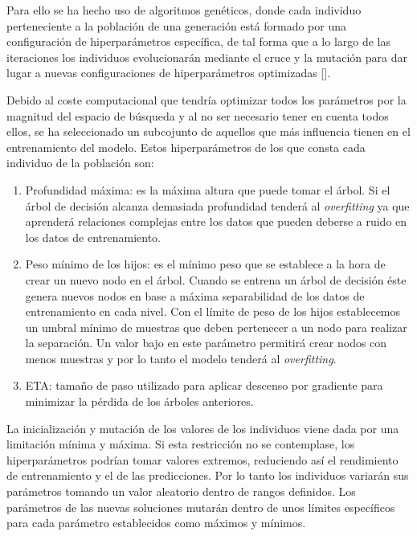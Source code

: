         Para ello se ha hecho uso de algoritmos genéticos, donde cada individuo perteneciente a la población de una generación está formado por una configuración de hiperparámetros específica, de tal forma que a lo largo de las iteraciones los individuos evolucionarán mediante el cruce y la mutación para dar lugar a nuevas configuraciones de hiperparámetros optimizadas [\cite{GAXGBoostPaper}].

        Debido al coste computacional que tendría optimizar todos los parámetros por la magnitud del espacio de búsqueda y al no ser necesario tener en cuenta todos ellos, se ha seleccionado un subcojunto de aquellos que más influencia tienen en el entrenamiento del modelo. Estos hiperparámetros de los que consta cada individuo de la población son:

        \begin{enumerate}

            \item Profundidad máxima: es la máxima altura que puede tomar el árbol. Si el árbol de decisión alcanza demasiada profundidad tenderá al \textit{overfitting} ya que aprenderá relaciones complejas entre los datos que pueden deberse a ruido en los datos de entrenamiento.

            \item Peso mínimo de los hijos: es el mínimo peso que se establece a la hora de crear un nuevo nodo en el árbol. Cuando se entrena un árbol de decisión éste genera nuevos nodos en base a máxima separabilidad de los datos de entrenamiento en cada nivel. Con el límite de peso de los hijos establecemos un umbral mínimo de muestras que deben pertenecer a un nodo para realizar la separación. Un valor bajo en este parámetro permitirá crear nodos con menos muestras y por lo tanto el modelo tenderá al \textit{overfitting}.

            \item ETA: tamaño de paso utilizado para aplicar descenso por gradiente para minimizar la pérdida de los árboles anteriores.

        \end{enumerate}

        La inicialización y mutación de los valores de los individuos viene dada por una limitación mínima y máxima. Si esta restricción no se contemplase, los hiperparámetros podrían tomar valores extremos, reduciendo así el rendimiento de entrenamiento y el de las predicciones. Por lo tanto los individuos variarán sus parámetros tomando un valor aleatorio dentro de rangos definidos. Los parámetros de las nuevas soluciones mutarán dentro de unos límites específicos para cada parámetro establecidos como máximos y mínimos.


